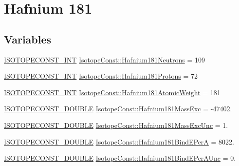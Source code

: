 \hypertarget{group___isotope_const-_hafnium-_hf181}{}\section{Hafnium 181}
\label{group___isotope_const-_hafnium-_hf181}
\subsection*{Variables}
\begin{DoxyCompactItemize}
\item 
\mbox{\hyperlink{group___isotope_const-_macros_ga5f18360b3e99483a35c32d789e62621c}{I\+S\+O\+T\+O\+P\+E\+C\+O\+N\+S\+T\+\_\+\+I\+NT}} \mbox{\hyperlink{group___isotope_const-_hafnium-_hf181_ga5e367c54db52d15ab6bab3bdb1ba2da6}{Isotope\+Const\+::\+Hafnium181\+Neutrons}} = 109
\item 
\mbox{\hyperlink{group___isotope_const-_macros_ga5f18360b3e99483a35c32d789e62621c}{I\+S\+O\+T\+O\+P\+E\+C\+O\+N\+S\+T\+\_\+\+I\+NT}} \mbox{\hyperlink{group___isotope_const-_hafnium-_hf181_ga6b91facb261c9c8ac39db231a97ea1fc}{Isotope\+Const\+::\+Hafnium181\+Protons}} = 72
\item 
\mbox{\hyperlink{group___isotope_const-_macros_ga5f18360b3e99483a35c32d789e62621c}{I\+S\+O\+T\+O\+P\+E\+C\+O\+N\+S\+T\+\_\+\+I\+NT}} \mbox{\hyperlink{group___isotope_const-_hafnium-_hf181_ga4a9a82f6165dbfcf82761132b5d173bb}{Isotope\+Const\+::\+Hafnium181\+Atomic\+Weight}} = 181
\item 
\mbox{\hyperlink{group___isotope_const-_macros_ga8f45a7272ce02c0b4c65c44636ed719a}{I\+S\+O\+T\+O\+P\+E\+C\+O\+N\+S\+T\+\_\+\+D\+O\+U\+B\+LE}} \mbox{\hyperlink{group___isotope_const-_hafnium-_hf181_ga0c7e28c31861b96e704f961533fb4f74}{Isotope\+Const\+::\+Hafnium181\+Mass\+Exc}} = -\/47402.
\item 
\mbox{\hyperlink{group___isotope_const-_macros_ga8f45a7272ce02c0b4c65c44636ed719a}{I\+S\+O\+T\+O\+P\+E\+C\+O\+N\+S\+T\+\_\+\+D\+O\+U\+B\+LE}} \mbox{\hyperlink{group___isotope_const-_hafnium-_hf181_ga42a0c51a8866f9e462ff73039dbf3109}{Isotope\+Const\+::\+Hafnium181\+Mass\+Exc\+Unc}} = 1.
\item 
\mbox{\hyperlink{group___isotope_const-_macros_ga8f45a7272ce02c0b4c65c44636ed719a}{I\+S\+O\+T\+O\+P\+E\+C\+O\+N\+S\+T\+\_\+\+D\+O\+U\+B\+LE}} \mbox{\hyperlink{group___isotope_const-_hafnium-_hf181_ga1646c64b711e54ec38cf622e0950cd6e}{Isotope\+Const\+::\+Hafnium181\+Bind\+E\+PerA}} = 8022.
\item 
\mbox{\hyperlink{group___isotope_const-_macros_ga8f45a7272ce02c0b4c65c44636ed719a}{I\+S\+O\+T\+O\+P\+E\+C\+O\+N\+S\+T\+\_\+\+D\+O\+U\+B\+LE}} \mbox{\hyperlink{group___isotope_const-_hafnium-_hf181_ga2c0acb47534c68d8cf35df43938fcd8a}{Isotope\+Const\+::\+Hafnium181\+Bind\+E\+Per\+A\+Unc}} = 0.

\end{DoxyCompactItemize}
